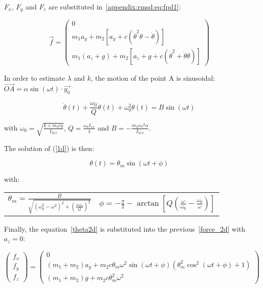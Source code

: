 \documentclass[\main/main.tex]{subfiles}
\begin{document}
$F_x$, $F_y$ and $F_z$ are substituted in~\eqref{appendix:rmsd:eq:fpd1}:

\begin{equation}
  \label{force_2d}
  \overrightarrow{f}
  =
  \begin{pmatrix}
  0 \\
  m_1 a_y + m_2 [a_y + c (\dot{\theta}^2 \theta - \ddot{\theta})] \\
  m_1 (a_z + g) + m_2 [a_z + g + c (\dot{\theta}^2 + \ddot{\theta} \theta)]
  \end{pmatrix}
\end{equation}

In order to estimate $\lambda$ and $k$, the motion of the point A is sinusoidal: $\overrightarrow{OA} = \alpha \sin(\omega t) \cdot \overrightarrow{y_0}$

\begin{equation}
 \label{1d}
 \ddot{\theta}(t) + \frac{\omega_0}{Q} \dot{\theta}(t) + \omega_0^2 \theta(t) = B \sin(\omega t)
\end{equation}

with $\omega_0 = \sqrt{\frac{k + m_2 c g}{I_{2xx}}}$, $Q = \frac{\omega_0 I_{xx}}{\lambda}$ and $B = -\frac{m_2 c \omega^2 \alpha}{I_{2xx}}$.

The solution of (\ref{1d}) is then:


\begin{equation}
  \label{theta2d}
  \theta(t) = \theta_m \sin(\omega t + \phi)
\end{equation}


with:
{\centering
 \begin{tabular}{cc}
  $\theta_m = \frac{B}{\sqrt{{(\omega_0^2 - \omega^2)}^2 + {\left( \frac{\omega \omega_0}{Q}\right)}^2}}$
    & $\phi = - \frac{\pi}{2} - \arctan \left[ Q \left( \frac{\omega}{\omega_0} - \frac{\omega_0}{\omega} \right) \right] $ \\
 \end{tabular}
 \par}

\vspace{0.5cm}

Finally, the equation~\eqref{theta2d} is substituted into the previous~\eqref{force_2d} with $a_z = 0$:

\begin{equation*}
  \begin{pmatrix}
  f_x \\
  f_y \\
  f_z
  \end{pmatrix}
  =
  \begin{pmatrix}
  0 \\
  (m_1 + m_2) a_y + m_2 c \theta_m \omega^2 \sin(\omega t + \phi) (\theta_m^2 \cos^2(\omega t + \phi) + 1)  \\
  (m_1 + m_2) g + m_2 c \theta_m^2 \omega^2
  \end{pmatrix}
\end{equation*}
\end{document}
